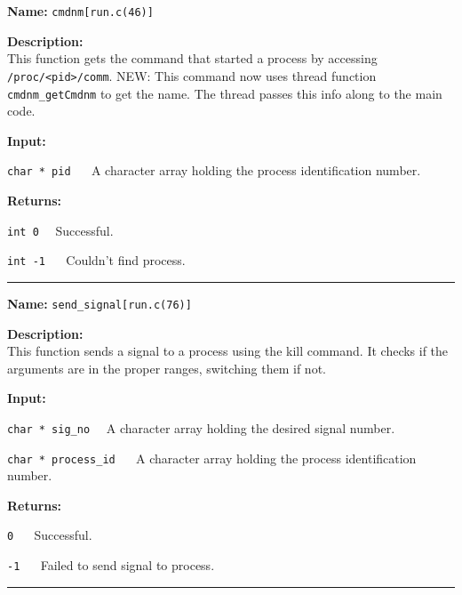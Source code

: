 \documentclass[11pt,a4paper]{article}
\begin{document}
\begin{description}
\item \textbf{Name:} 
\verb|cmdnm[run.c(46)]|

\item \textbf{Description:}\\
This function gets the command that started a process by accessing \verb|/proc/<pid>/comm|. NEW: This command now uses thread function \verb|cmdnm_getCmdnm| to get the name. The thread passes this info along to the main code.

\item \textbf{Input:}
\begin{description}
\item \verb|char * pid| ~~ A character array holding the process identification number.
\end{description}

\item \textbf{Returns:}
\begin{description}
\item \verb|int 0|~~ Successful.
\item \verb|int -1| ~~ Couldn't find process.
\end{description}
\end{description}\hrule

\begin{description}
\item \textbf{Name:} 
\verb|send_signal[run.c(76)]|

\item \textbf{Description:}\\
This function sends a signal to a process using the kill command. It checks if the arguments are in the proper ranges, switching them if not.

\item \textbf{Input:}
\begin{description}
\item \verb|char * sig_no|~~ A character array holding the desired signal number.
\item \verb|char * process_id| ~~ A character array holding the process identification number.
\end{description}

\item \textbf{Returns:}
\begin{description}
\item \verb|0|  ~~ Successful.
\item \verb|-1| ~~ Failed to send signal to process.
\end{description}
\end{description}\hrule
\end{document}
